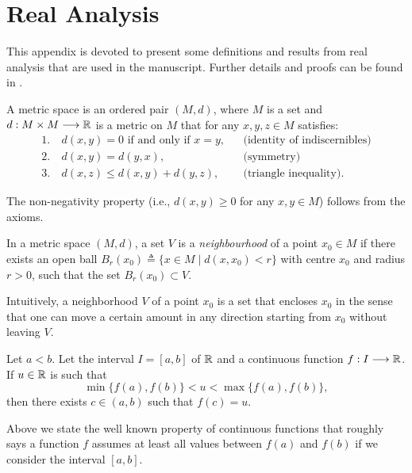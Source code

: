 \chapter{Real Analysis} \label{app:RealAnalysis}

This appendix is devoted to present some definitions and results from real analysis that are used in the manuscript.
%
Further details and proofs can be found in \cite{rudin1976principles}.

\begin{definition} \label{def:metric_space}
    A metric space is an ordered pair $(M,d)$, where $M$ is a set and $d:M \times M \longrightarrow {\mathbb R}$ is a metric on $M$ that for any $x,y,z \in M$ satisfies:
    \begin{align*}
        1.&~d(x,y) = 0 \text{ if and only if } x=y, &&\text{(identity of indiscernibles)}\\
        2.&~d(x,y) = d(y,x), &&\text{(symmetry)}\\
        3.&~d(x,z) \le d(x,y) + d(y,z), &&\text{(triangle inequality)}.
    \end{align*}
\end{definition}

The non-negativity property (i.e., $d(x,y) \ge 0$ for any $x,y\in M$) follows from the axioms.

\begin{definition} \label{def:neighborhood}
    In a metric space $(M,d)$, a set $V$ is a \textit{neighbourhood} of a point $x_0\in M$ if there exists an open ball $B_r(x_0) \triangleq \{x \in M \mid d(x,x_0) < r\}$ with centre $x_0$ and radius $r>0$, such that the set $B_r(x_0) \subset V$. 
\end{definition}

Intuitively, a neighborhood $V$ of a point $x_0$ is a set that encloses $x_0$ in the sense that one can move a certain amount in any direction starting from $x_0$ without leaving $V$.

\begin{theorem} \label{th:IVT}
    Let $a < b$. Let the interval $I = [a,b]$ of ${\mathbb R}$ and a continuous function $f:I\longrightarrow{\mathbb R}$.
    If $u\in{\mathbb R}$ is such that \[\min\{f(a),f(b)\} < u < \max\{f(a),f(b)\},\] then there exists $c\in(a,b)$ such that $f(c) = u$.
\end{theorem}

Above we state the well known property of continuous functions that roughly says a function $f$ assumes at least all values between $f(a)$ and $f(b)$ if we consider the interval $[a,b]$.

